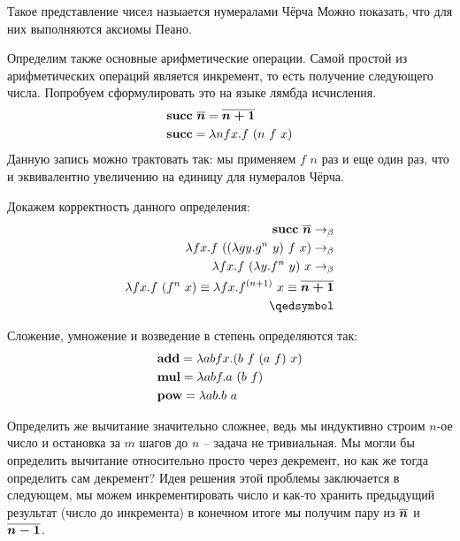 \documentclass[lambda.tex]{subfiles}
\begin{document}
Такое представление чисел назыается нумералами Чёрча
Можно показать, что для них выполняются аксиомы Пеано.

Определим также основные арифметические операции. 
Самой простой из арифметических операций является инкремент, то есть получение следующего числа. Попробуем сформулировать это на языке лямбда исчисления.
\begin{align*}
	& \text{\textbf{succ}}\ \boldsymbol{\overline{n}} = \boldsymbol{\overline{n+1}}\\
	& \text{\textbf{succ}} = \lambda nfx. f\ (n\ f\ x)
\end{align*}
Данную запись можно трактовать так: мы применяем $f$ $n$ раз и еще один раз, что и эквивалентно увеличению на единицу для нумералов Чёрча.

Докажем корректность данного определения:
\begin{align*}
	\mmterm{succ}\ \mmchurchn{n} \rb\\
	\lambda fx.f\ ((\lambda gy.g^n\ y)\ f\ x) \rb\\
	\lambda fx.f\ (\lambda y.f^n\ y)\ x \rb\\
	\lambda fx.f\ (f^n\ x) \equiv \lambda fx.f^{(n+1)}\ x \equiv \mmchurchn{n+1}\\
	\qedsymbol
\end{align*}

Сложение, умножение и возведение в степень определяются так:
\begin{align*}
	&\text{\textbf{add}} = \lambda abfx.(b\ f\ (a\ f)\ x)\\
	&\text{\textbf{mul}} = \lambda abf.a\ (b\ f)\\
	&\text{\textbf{pow}} = \lambda ab.b\ a
\end{align*}

Определить же вычитание значительно сложнее, ведь мы индуктивно строим $n$-ое число и остановка за $m$ шагов до $n$ -- задача не тривиальная. Мы могли бы определить вычитание относительно просто через декремент, но как же тогда определить сам декремент?
Идея решения этой проблемы заключается в следующем, мы можем инкрементировать число и как-то хранить предыдущий результат (число до инкремента) в конечном итоге мы получим пару из $\boldsymbol{\overline{n}}$ и $\boldsymbol{\overline{n-1}}$.
\end{document}

